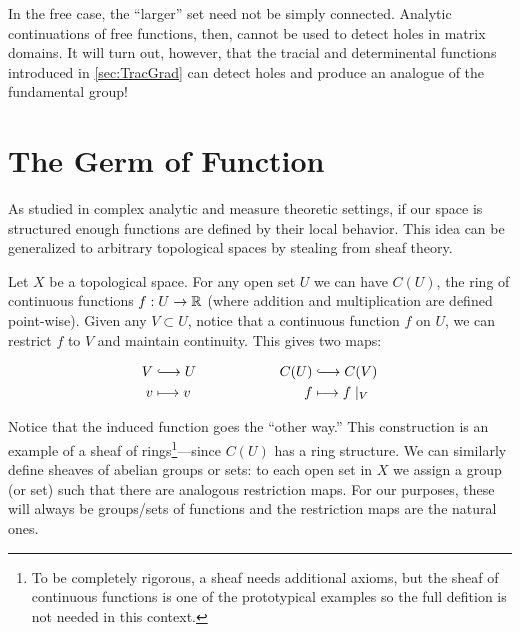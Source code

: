 In the free case, the ``larger'' set need not be simply connected. Analytic
continuations of free functions, then, cannot be used to detect holes in matrix
domains. It will turn out, however, that the tracial and determinental functions
introduced in \cref{sec:TracGrad} can detect holes and produce an analogue of
the fundamental group!

\section{The Germ of Function}%
\label{sec:germs}

As studied in complex analytic and measure theoretic settings, if our space is
structured enough functions are defined by their local behavior. This idea can
be generalized to arbitrary topological spaces {\color{fgreen}by stealing from sheaf theory}.

Let \(X\) be a topological space. For any open set \(U\) we can have \(C(U)\),
the ring of continuous functions \(f: U \to \mathbb{R} \) (where addition and
multiplication are defined point-wise).
Given any \(V \subset U\), notice that a continuous function \(f\) on \(U\), we
can restrict \(f\) to \(V\) and maintain continuity. This gives two maps:

\begin{equation*}
\begin{split}
	V &\lhook\joinrel\longrightarrow U \\
  v &\longmapsto v
\end{split} \qquad \qquad \qquad
\begin{split}
	C(U) &\lhook\joinrel\longrightarrow C(V) \\
  f &\longmapsto f \mid _V
\end{split}
\end{equation*}

Notice that the induced function goes the ``other way.'' This construction is an
example of a sheaf of rings\footnote{To be completely rigorous, a sheaf needs
  additional axioms, but the sheaf of continuous functions is one of the
  prototypical examples so the full defition is not needed in this
  context.}---since \(C(U)\) has a ring structure. We can similarly define sheaves
of abelian groups or sets: to each open set in \(X\) we assign a group (or set)
such that there are analogous restriction maps. For our purposes, these will
always be groups/sets of functions and the restriction maps are the natural ones.

